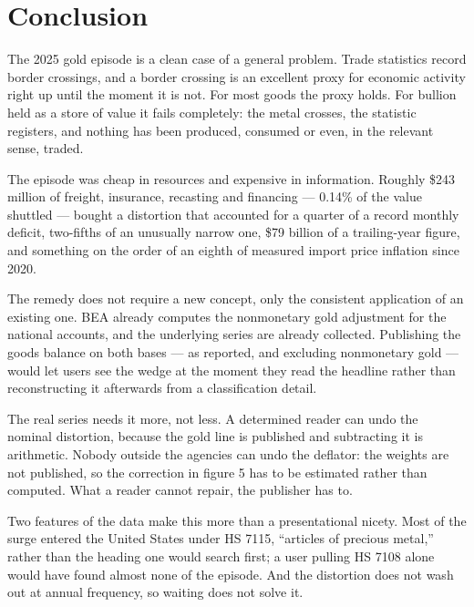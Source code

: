 \documentclass[11pt]{article}
\begin{document}
\section{Conclusion}

The 2025 gold episode is a clean case of a general problem. Trade statistics
record border crossings, and a border crossing is an excellent proxy for
economic activity right up until the moment it is not. For most goods the proxy
holds. For bullion held as a store of value it fails completely: the metal
crosses, the statistic registers, and nothing has been produced, consumed or
even, in the relevant sense, traded.

The episode was cheap in resources and expensive in information. Roughly
\$243 million of freight, insurance, recasting and financing --- 0.14\% of the
value shuttled --- bought a distortion that accounted for a quarter of a record
monthly deficit, two-fifths of an unusually narrow one, \$79 billion of a
trailing-year figure, and something on the order of an eighth of measured import
price inflation since 2020.

The remedy does not require a new concept, only the consistent application of an
existing one. BEA already computes the nonmonetary gold adjustment for the
national accounts, and the underlying series are already collected. Publishing
the goods balance on both bases --- as reported, and excluding nonmonetary
gold --- would let users see the wedge at the moment they read the headline
rather than reconstructing it afterwards from a classification detail.

The real series needs it more, not less. A determined reader can undo the
nominal distortion, because the gold line is published and subtracting it is
arithmetic. Nobody outside the agencies can undo the deflator: the weights are
not published, so the correction in figure 5 has to be estimated rather than
computed. What a reader cannot repair, the publisher has to.

Two features of the data make this more than a presentational nicety. Most of
the surge entered the United States under HS 7115, ``articles of precious
metal,'' rather than the heading one would search first; a user pulling HS 7108
alone would have found almost none of the episode. And the distortion does not wash out at annual frequency, so
waiting does not solve it.
\end{document}
